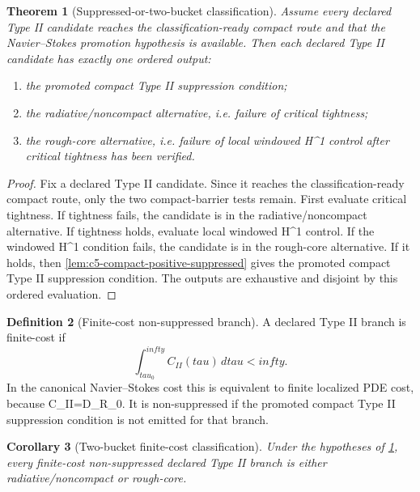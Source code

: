 \documentclass[11pt]{amsart}
\def\({}%
\def\){}%
\def\tilde#1{#1}%
\def\mathfrak#1{#1}%
\def\mathrm#1{#1}%
\def\tau{tau}%
\def\infty{infty}%
\theoremstyle{plain}
\newtheorem{theorem}{Theorem}[section]
\newtheorem{corollary}[theorem]{Corollary}
\theoremstyle{definition}
\newtheorem{definition}[theorem]{Definition}
\theoremstyle{remark}
\begin{document}
\begin{theorem}[Suppressed-or-two-bucket classification]
\label{thm:c5-suppressed-or-two-bucket}
Assume every declared Type II candidate reaches the classification-ready
compact route and that the Navier--Stokes promotion hypothesis is available.
Then each declared Type II candidate has exactly one ordered output:
\begin{enumerate}[label=\textup{(\roman*)}]
\item the promoted compact Type II suppression condition;
\item the radiative/noncompact alternative, i.e. failure of critical tightness;
\item the rough-core alternative, i.e. failure of local windowed \(H^1\) control
after critical tightness has been verified.
\end{enumerate}
\end{theorem}

\begin{proof}
Fix a declared Type II candidate.  Since it reaches the
classification-ready compact route, only the two compact-barrier tests
remain.  First evaluate critical tightness.  If tightness fails, the candidate
is in the radiative/noncompact alternative.  If tightness holds, evaluate
local windowed \(H^1\) control.  If the windowed \(H^1\) condition fails, the
candidate is in the rough-core alternative.  If it holds, then
\cref{lem:c5-compact-positive-suppressed} gives the promoted compact Type II
suppression condition.  The outputs are exhaustive and disjoint by this ordered
evaluation.
\end{proof}

\begin{definition}[Finite-cost non-suppressed branch]
\label{def:c5-finite-cost-nonsuppressed}
A declared Type II branch is finite-cost if
\[
  \int_{\tau_0}^{\infty}\mathfrak C_{\mathrm{II}}(\tau)\,d\tau<\infty.
\]
In the canonical Navier--Stokes cost this is equivalent to finite localized PDE
cost, because
\(\mathfrak C_{\mathrm{II}}=\tilde{\mathfrak D}_{R_0}\).  It is
non-suppressed if the promoted compact Type II suppression condition is not
emitted for that branch.
\end{definition}

\begin{corollary}[Two-bucket finite-cost classification]
\label{cor:c5-two-bucket-finite-cost}
Under the hypotheses of \cref{thm:c5-suppressed-or-two-bucket}, every
finite-cost non-suppressed declared Type II branch is either
radiative/noncompact or rough-core.
\end{corollary}
\end{document}
